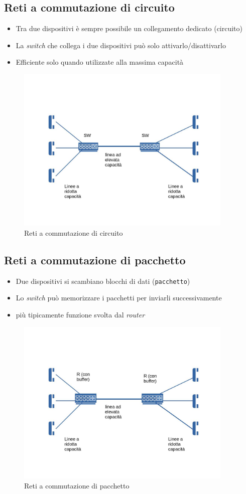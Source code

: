 \documentclass{book}
\begin{document}
\subsection{Reti a commutazione di circuito}
\begin{itemize}
\item Tra due dispositivi è sempre possibile un collegamento dedicato (circuito)
\item La \textit{switch} che collega i due dispositivi può solo attivarlo/disattivarlo
\item Efficiente solo quando utilizzate alla massima capacità
\end{itemize}
\begin{figure}[!h]
  \centering
  \includegraphics[weight=4cm,height=8cm]{img/Reti a commutazione di circuito.jpg}
  \caption{Reti a commutazione di circuito}
\end{figure}
\subsection{Reti a commutazione di pacchetto}
\begin{itemize}
\item Due dispositivi si scambiano blocchi di dati ({\tt pacchetto})
\item Lo {\it switch} può memorizzare i pacchetti per inviarli successivamente
\item più tipicamente funzione svolta dal {\em router}
\end{itemize}
\begin{figure}[!h]
  \centering
  \includegraphics[weight=4cm,height=8cm]{img/Reti a commutazione di pacchetto.jpg}
  \caption{Reti a commutazione di pacchetto}
\end{figure}
\end{document}
